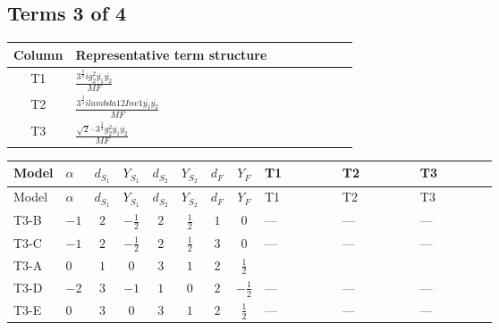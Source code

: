 \documentclass[8pt]{article}
\begin{document}
\begin{landscape}
\subsection*{Terms 3 of 4}
\begin{center}
\begin{tabular}{@{}c >{\raggedright\arraybackslash}p{0.82\linewidth}@{}}
\toprule
Column & Representative term structure \\
\midrule
T1 & \(\displaystyle \frac{3^{\frac{3}{4}} i g_{2}^{2} \overline{y_{1}} \overline{y_{2}}}{MF}\) \\
\midrule
T2 & \(\displaystyle \frac{3^{\frac{3}{4}} i lambda12Inv1 \overline{y_{1}} \overline{y_{2}}}{MF}\) \\
\midrule
T3 & \(\displaystyle \frac{\sqrt{2} \cdot 3^{\frac{3}{4}} g_{2}^{2} \overline{y_{1}} \overline{y_{2}}}{MF}\) \\
\midrule
\bottomrule
\end{tabular}
\end{center}
\smallskip
\tiny
\begin{longtable}{@{}llcccccc >{\raggedright\arraybackslash}p{0.21\linewidth} >{\raggedright\arraybackslash}p{0.21\linewidth} >{\raggedright\arraybackslash}p{0.21\linewidth}@{}}
\toprule
Model & $\alpha$ & $d_{S_1}$ & $Y_{S_1}$ & $d_{S_2}$ & $Y_{S_2}$ & $d_F$ & $Y_F$ & T1 & T2 & T3 \\
\midrule
\endfirsthead
\toprule
Model & $\alpha$ & $d_{S_1}$ & $Y_{S_1}$ & $d_{S_2}$ & $Y_{S_2}$ & $d_F$ & $Y_F$ & T1 & T2 & T3 \\
\midrule
\endhead
T3-B & $-1$ & $2$ & $-\frac{1}{2}$ & $2$ & $\frac{1}{2}$ & $1$ & $0$ & --- & --- & --- \\
\midrule
T3-C & $-1$ & $2$ & $-\frac{1}{2}$ & $2$ & $\frac{1}{2}$ & $3$ & $0$ & --- & --- & --- \\
\midrule
T3-A & $0$ & $1$ & $0$ & $3$ & $1$ & $2$ & $\frac{1}{2}$ & \scriptsize\adjustbox{max width=\linewidth}{$\begin{gathered} - \frac{25 \cdot 3^{\frac{3}{4}} i g_{2}^{2} \overline{y_{1}} \overline{y_{2}}}{24 MF}\end{gathered}$} & \scriptsize\adjustbox{max width=\linewidth}{$\begin{gathered} - \frac{3^{\frac{3}{4}} i lambda12Inv1 \overline{y_{1}} \overline{y_{2}}}{6 MF}\end{gathered}$} & \scriptsize\adjustbox{max width=\linewidth}{$\begin{gathered} - \frac{\sqrt{2} \cdot 3^{\frac{3}{4}} g_{2}^{2} \overline{y_{1}} \overline{y_{2}}}{6 MF}\end{gathered}$} \\
\midrule
T3-D & $-2$ & $3$ & $-1$ & $1$ & $0$ & $2$ & $-\frac{1}{2}$ & --- & --- & --- \\
\midrule
T3-E & $0$ & $3$ & $0$ & $3$ & $1$ & $2$ & $\frac{1}{2}$ & --- & --- & --- \\
\midrule
\bottomrule
\end{longtable}
\clearpage

\end{landscape}
\end{document}
